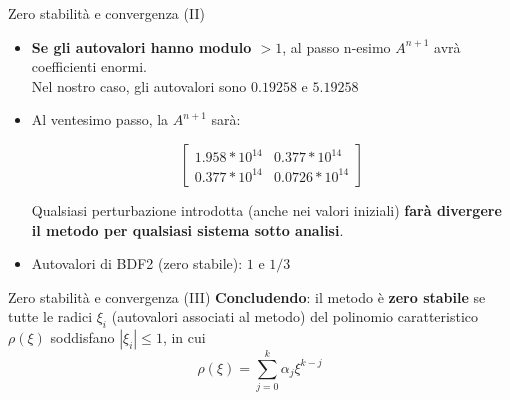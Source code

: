 \documentclass[aspectratio=169, 10pt, handout,usenames,dvipsnames]{beamer}
\begin{document}
    \begin{frame}{Zero stabilità e convergenza (II)}
        \begin{itemize}
            \item \textbf{Se gli autovalori hanno modulo $>1$}, al passo n-esimo $A^{n+1}$ avrà coefficienti enormi. \\ Nel nostro caso, gli autovalori sono  $0.19258$ e \alert{$5.19258$}
            \item Al ventesimo passo, la $A^{n+1}$ sarà: 
            \vspace{0.5cm}
            \begin{center}
                \[\begin{bmatrix} 
                1.958*10^{14} & 0.377*10^{14} \\ 
                0.377*10^{14} & 0.0726*10^{14}
                \end{bmatrix} \]
            \end{center}
            \vspace{0.5cm}
            
            
            Qualsiasi perturbazione introdotta (anche nei valori iniziali) \textbf{farà divergere il metodo per qualsiasi sistema sotto analisi}.
            \medskip
            \medskip
            \item Autovalori di BDF2 (zero stabile): $1$ e $1/3$
        \end{itemize} 
    \end{frame}
    
    \begin{frame}{Zero stabilità e convergenza (III)}
        \textbf{Concludendo}: il metodo è \textbf{zero stabile} se tutte le radici $\xi_i$ (autovalori associati al metodo) del polinomio caratteristico $\rho(\xi)$ soddisfano $|\xi_i|\leq1$, in cui 
        $$
            \rho(\xi)=\displaystyle\sum_{j=0}^k \alpha_j\xi^{k-j}
        $$
    \end{frame}
  
\end{document}
